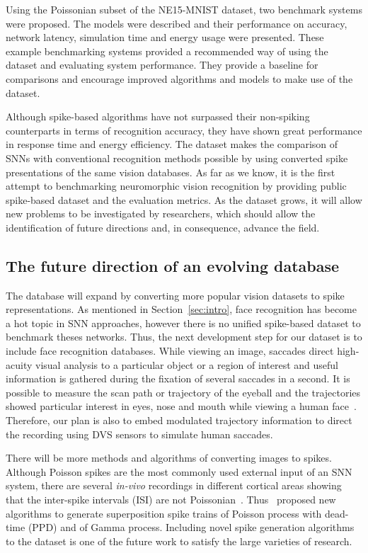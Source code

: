 \documentclass{frontiersENG} %
\begin{document}
Using the Poissonian subset of the NE15-MNIST dataset, two benchmark systems were proposed. 
The models were described and their performance on accuracy, network latency, simulation time and energy usage were presented.
These example benchmarking systems provided a recommended way of using the dataset and evaluating system performance.
They provide a baseline for comparisons and encourage improved algorithms and models to make use of the dataset.

Although spike-based algorithms have not surpassed their non-spiking counterparts in terms of recognition accuracy, they have shown great performance in response time and energy efficiency.
The dataset makes the comparison of SNNs with conventional recognition methods possible by using converted spike presentations of the same vision databases.
As far as we know, it is the first attempt to benchmarking neuromorphic vision recognition by providing public spike-based dataset and the evaluation metrics.
As the dataset grows, it will allow new problems to be investigated by researchers, which should allow the identification of future directions and, in consequence, advance the field.
\subsection{The future direction of an evolving database}
The database will expand by converting more popular vision datasets to spike representations.
As mentioned in Section~\ref{sec:intro}, face recognition has become a hot topic in SNN approaches, however there is no unified spike-based dataset to benchmark theses networks.
Thus, the next development step for our dataset is to include face recognition databases.
While viewing an image,  saccades direct high-acuity visual analysis to a particular object or a region of interest and useful information is gathered during the fixation of several saccades in a second.
It is possible to measure the scan path or trajectory of the eyeball and the trajectories showed particular interest in eyes, nose and mouth while viewing a human face~\citep{yarbus1967eye}.
Therefore, our plan is also to embed modulated trajectory information to direct the recording using DVS sensors to simulate human saccades.

There will be more methods and algorithms of converting images to spikes.
Although Poisson spikes are the most commonly used external input of an SNN system, there are several \textit{in-vivo} recordings in different cortical areas showing that the inter-spike intervals (ISI) are not Poissonian~\citep{deger2012statistical}. 
Thus~\citet{deger2012statistical} proposed new algorithms to generate superposition spike trains of Poisson process with dead-time (PPD) and of Gamma process.
Including novel spike generation algorithms to the dataset is one of the future work to satisfy the large varieties of research.
\end{document}
